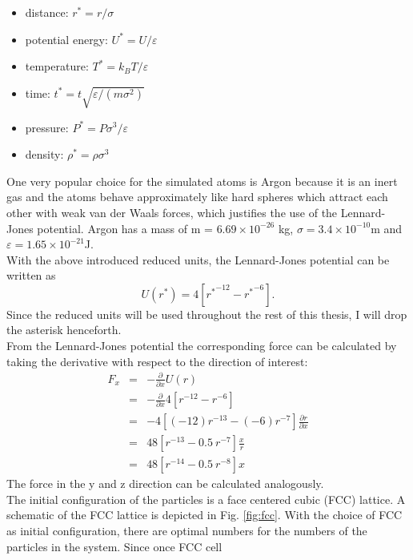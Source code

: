 \documentclass[12pt]{article}
\begin{document}
\begin{itemize}
    \item {distance:} $r^* = r/\sigma$
    \item {potential energy:} $U^* = U/\varepsilon$
    \item {temperature:} $T^* = k_B T/\varepsilon$
    \item {time:} $t^* = t\sqrt{\varepsilon/(m\sigma^2)}$
    \item {pressure:} $P^* = P\sigma^3/\varepsilon$
    \item {density:} $\rho^* = \rho \sigma^3$
\end{itemize}
One very popular choice for the simulated atoms is Argon because it is an inert gas and the atoms behave 
approximately like hard spheres which attract each other with weak van der Waals forces, which justifies the use of the Lennard-Jones potential. 
Argon has a mass of m = $6.69 \times 10^{-26}$ kg, $\sigma = 3.4 \times 10^{-10}$m and $\varepsilon = 1.65 \times 10^{-21}$J.\\
With the above introduced reduced units, the Lennard-Jones potential can be written as
\begin{equation}
    U(r^*) = 4\left[{r^*}^{-12} - {r^*}^{-6}\right].
\end{equation}
Since the reduced units will be used throughout the rest of this thesis, I will drop the asterisk henceforth.\\
From the Lennard-Jones potential the corresponding force can be calculated by taking the derivative with respect to the direction of interest:
\begin{eqnarray}
    F_{x} &=& -\frac{\partial}{\partial x} U(r) \nonumber\\
                &=& -\frac{\partial}{\partial x} 4\left[{r}^{-12} - {r}^{-6}\right] \nonumber\\
                &=& -4 \left[(-12){r}^{-13} - (-6){r}^{-7}\right] \frac{\partial r}{\partial x} \nonumber\\
                &=& 48 \left[r^{-13} - 0.5 \ r^{-7}\right] \frac{x}{r} \nonumber\\
    \label{eq:ljforce} &=& 48 \left[r^{-14} - 0.5 \ r^{-8}\right] x
\end{eqnarray}
The force in the y and z direction can be calculated analogously.\\
The initial configuration of the particles is a face centered cubic (FCC) lattice. A schematic of the FCC lattice is depicted in Fig. \ref{fig:fcc}.
With the choice of FCC as initial configuration, there are optimal numbers for the numbers of the particles in the system. Since once FCC cell 
\end{document}
